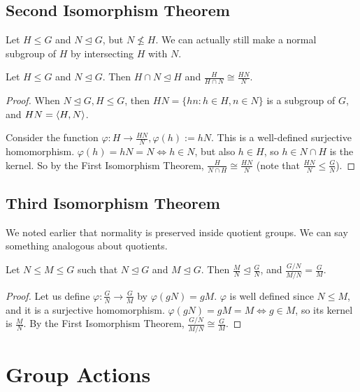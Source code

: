 \documentclass{article}
\begin{document}
	\subsection{Second Isomorphism Theorem}
	Let $H\leq G$ and $N\trianglelefteq G$, but $N \nleq H$. We can actually still make a normal subgroup of $H$ by intersecting $H$ with $N$.
	\begin{theorem}
		Let $H \leq G$ and $N \trianglelefteq G$. Then $H \cap N \trianglelefteq H$ and $\frac{H}{H \cap N} \cong \frac{HN}{N}$.
	\end{theorem}
	\begin{proof}
		When $N \trianglelefteq G, H \leq G$, then $HN = \{ hn: h \in H, n \in N \}$ is a subgroup of $G$, and $HN = \langle H, N \rangle$.
		
		Consider the function $\varphi: H \to \frac{HN}{N}, \varphi(h) := hN$. This is a well-defined surjective homomorphism. $\varphi(h) = hN = N \iff h \in N$, but also $h \in H$, so $h \in N \cap H$ is the kernel. So by the First Isomorphism Theorem, $\frac{H}{N \cap H} \cong \frac{HN}{N}$ (note that $\frac{HN}{N} \leq \frac{G}{N}$).
	\end{proof}

	\subsection{Third Isomorphism Theorem}
	We noted earlier that normality is preserved inside quotient groups. We can say something analogous about quotients.
	\begin{theorem}
		Let $N \leq M \leq G$ such that $N \trianglelefteq G$ and $M \trianglelefteq G$. Then $\frac{M}{N} \trianglelefteq \frac{G}{N}$, and $\frac{G/N}{M/N} = \frac{G}{M}$.
	\end{theorem}
	\begin{proof}
		Let us define $\varphi: \frac{G}{N} \to \frac{G}{M}$ by $\varphi(gN) = gM$. $\varphi$ is well defined since $N \leq M$, and it is a surjective homomorphism. $\varphi(gN) = gM = M \iff g \in M$, so its kernel is $\frac{M}{N}$. By the First Isomorphism Theorem, $\frac{G/N}{M/N} \cong \frac{G}{M}$.
	\end{proof}

	\section{Group Actions}
\end{document}

